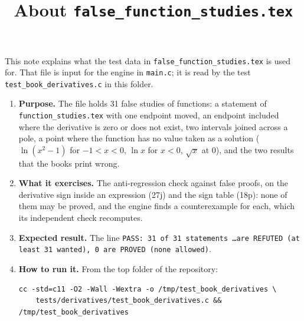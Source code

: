 \documentclass[11pt,a4paper]{article}
\title{About \texttt{false\_function\_studies.tex}}
\author{}
\date{}
\begin{document}
\maketitle
This note explains what the test data in \texttt{false\_function\_studies.tex} is used for. That file is input for the engine in \texttt{main.c}; it is read by the test \texttt{test\_book\_derivatives.c} in this folder.

\begin{enumerate}
\item \textbf{Purpose.} The file holds 31 false studies of functions: a statement of \texttt{function\_studies.tex} with one endpoint moved, an endpoint included where the derivative is zero or does not exist, two intervals joined across a pole, a point where the function has no value taken as a solution ($\ln(x^{2} - 1)$ for $-1 < x < 0$, $\ln x$ for $x < 0$, $\sqrt{x}$ at $0$), and the two results that the books print wrong.

\item \textbf{What it exercises.} The anti-regression check against false proofs, on the derivative sign inside an expression (27j) and the sign table (18p): none of them may be proved, and the engine finds a counterexample for each, which its independent check recomputes.

\item \textbf{Expected result.} The line \texttt{PASS: 31 of 31 statements \ldots are REFUTED (at least 31 wanted), 0 are PROVED (none allowed)}.

\item \textbf{How to run it.} From the top folder of the repository:
\begin{verbatim}
cc -std=c11 -O2 -Wall -Wextra -o /tmp/test_book_derivatives \
    tests/derivatives/test_book_derivatives.c && /tmp/test_book_derivatives
\end{verbatim}
\end{enumerate}
\end{document}
